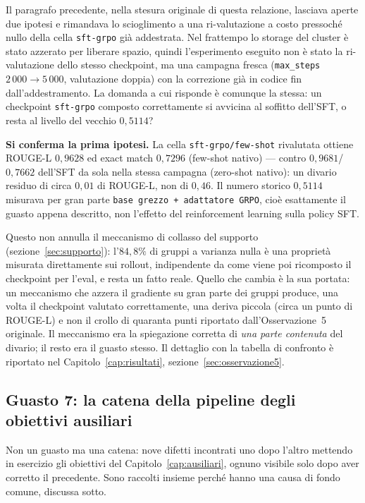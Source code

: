 Il paragrafo precedente, nella stesura originale di questa relazione,
lasciava aperte due ipotesi e rimandava lo scioglimento a una
ri-valutazione a costo pressoché nullo della cella \texttt{sft-grpo} già
addestrata. Nel frattempo lo storage del cluster è stato azzerato per
liberare spazio, quindi l'esperimento eseguito non è stato la
ri-valutazione dello stesso checkpoint, ma una campagna fresca (\texttt{max\_steps}
$2\,000 \to 5\,000$, valutazione doppia) con la correzione già in codice fin
dall'addestramento. La domanda a cui risponde è comunque la stessa: un
checkpoint \texttt{sft-grpo} composto correttamente si avvicina al soffitto
dell'SFT, o resta al livello del vecchio $0{,}5114$?

\textbf{Si conferma la prima ipotesi.} La cella \texttt{sft-grpo/few-shot}
rivalutata ottiene ROUGE-L $0{,}9628$ ed exact match $0{,}7296$ (few-shot
nativo) — contro $0{,}9681$/$0{,}7662$ dell'SFT da sola nella stessa
campagna (zero-shot nativo): un divario residuo di circa $0{,}01$ di
ROUGE-L, non di $0{,}46$. Il numero storico $0{,}5114$ misurava per gran parte
\texttt{base grezzo + adattatore GRPO}, cioè esattamente il guasto appena
descritto, non l'effetto del reinforcement learning sulla policy SFT.

Questo non annulla il meccanismo di collasso del supporto
(sezione~\ref{sec:supporto}): l'$84{,}8\%$ di gruppi a varianza nulla è una
proprietà misurata direttamente sui rollout, indipendente da come viene
poi ricomposto il checkpoint per l'eval, e resta un fatto reale. Quello che
cambia è la sua portata: un meccanismo che azzera il gradiente su gran
parte dei gruppi produce, una volta il checkpoint valutato correttamente,
una deriva piccola (circa un punto di ROUGE-L) e non il crollo di quaranta
punti riportato dall'Osservazione~5 originale. Il meccanismo era la
spiegazione corretta di \emph{una parte contenuta} del divario; il resto
era il guasto stesso. Il dettaglio con la tabella di confronto è
riportato nel Capitolo~\ref{cap:risultati}, sezione~\ref{sec:osservazione5}.

\subsection{Guasto 7: la catena della pipeline degli obiettivi ausiliari}
\label{sec:bug-ausiliari}

Non un guasto ma una catena: nove difetti incontrati uno dopo l'altro mettendo
in esercizio gli obiettivi del Capitolo~\ref{cap:ausiliari}, ognuno visibile
solo dopo aver corretto il precedente. Sono raccolti insieme perché hanno una
causa di fondo comune, discussa sotto.

